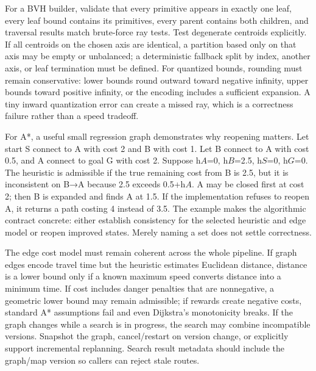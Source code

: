For a BVH builder, validate that every primitive appears in exactly one leaf, every leaf bound contains its primitives, every parent contains both children, and traversal results match brute-force ray tests. Test degenerate centroids explicitly. If all centroids on the chosen axis are identical, a partition based only on that axis may be empty or unbalanced; a deterministic fallback split by index, another axis, or leaf termination must be defined. For quantized bounds, rounding must remain conservative: lower bounds round outward toward negative infinity, upper bounds toward positive infinity, or the encoding includes a sufficient expansion. A tiny inward quantization error can create a missed ray, which is a correctness failure rather than a speed tradeoff.

For A*, a useful small regression graph demonstrates why reopening matters. Let start S connect to A with cost 2 and B with cost 1. Let B connect to A with cost 0.5, and A connect to goal G with cost 2. Suppose h\(A\)=0, h\(B\)=2.5, h\(S\)=0, h\(G\)=0. The heuristic is admissible if the true remaining cost from B is 2.5, but it is inconsistent on B→A because 2.5 exceeds 0.5+h\(A\). A may be closed first at cost 2; then B is expanded and finds A at 1.5. If the implementation refuses to reopen A, it returns a path costing 4 instead of 3.5. The example makes the algorithmic contract concrete: either establish consistency for the selected heuristic and edge model or reopen improved states. Merely naming a set  does not settle correctness.

The edge cost model must remain coherent across the whole pipeline. If graph edges encode travel time but the heuristic estimates Euclidean distance, distance is a lower bound only if a known maximum speed converts distance into a minimum time. If cost includes danger penalties that are nonnegative, a geometric lower bound may remain admissible; if rewards create negative costs, standard A* assumptions fail and even Dijkstra's monotonicity breaks. If the graph changes while a search is in progress, the search may combine incompatible versions. Snapshot the graph, cancel/restart on version change, or explicitly support incremental replanning. Search result metadata should include the graph/map version so callers can reject stale routes.

